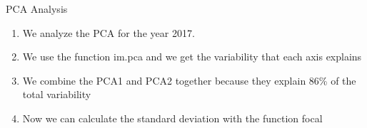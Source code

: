 \documentclass{beamer}
\begin{document}
\begin{frame}{PCA Analysis}
    \begin{enumerate}
        \item We analyze the PCA for the year 2017. 
        \item We use the function im.pca and we get the variability that each axis explains
        \item We combine the PCA1 and PCA2 together because they explain 86\% of the total variability
        \item Now we can calculate the standard deviation with the function focal
    \end{enumerate}

 
\end{frame}
\end{document}

